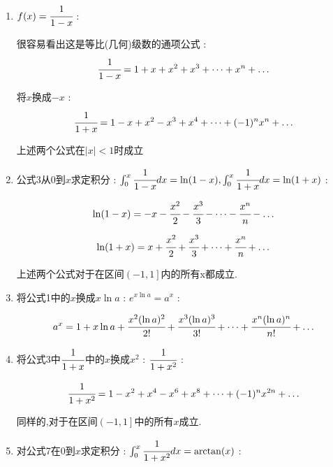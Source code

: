 \documentclass[UTF8,12pt]{ctexbook}
\newcommand{\derivative}{^\prime}
\newcommand{\fDerivative}[1]{\fint\derivative(#1)}
\newcommand{\defFunction}[1]{f(#1)}
\newcommand{\definiteIntegral}[2]{\int^{#1}_{#2}}
\newcommand{\absoluteValue}[1]{\left\lvert #1 \right\vert}
\begin{document}
{{{{{\begin{enumerate}
{            总结规律,可知 : 展开式只有奇数次项,并且正负会交替出现 :
            $$
              \sin(x) = x - \cfrac{x^3}{3!} + \cfrac{x^5}{5!} - \cfrac{x^7}{7!} + \dots + (-1)^n\cfrac{x^{2n + 1}}{(2n + 1)!} + \dots
            $$

            由$\fDerivative{x} = g(x)$,对上式求导就会得到$\cos$的展开式 :
            $$
              \cos(x) = 1 - \cfrac{x^2}{2!} + \cfrac{x^4}{4!} - \cfrac{x^6}{6!} + \dots + (-1)^n\cfrac{x^{2n}}{(2n)!} + \dots
            $$

            特点是只有偶次项.
            }
      \item {
            $\defFunction{x} = \cfrac{1}{1 - x}$ :

            很容易看出这是等比(几何)级数的通项公式 :
            $$
              \cfrac{1}{1 - x} =1 + x + x^2 + x^3 + \dots + x^n + \dots
            $$

            将$x$换成$-x$ :
            $$
              \cfrac{1}{1 + x} = 1 - x + x^2 - x^3 + x^4 + \dots + (-1)^nx^n + \dots
            $$

            上述两个公式在$\absoluteValue{x} < 1$时成立
            }
      \item{
            公式3从$0$到$x$求定积分 : $\definiteIntegral{x}{0}\cfrac{1}{1 - x}dx = \ln(1 - x),\definiteIntegral{x}{0}\cfrac{1}{1 + x}dx = \ln(1 + x)$ :

            $$
              \ln(1 - x) = -x - \cfrac{x^2}{2} - \cfrac{x^3}{3} - \dots - \cfrac{x^n}{n} - \dots
            $$

            $$
              \ln(1 + x) = x + \cfrac{x^2}{2} + \cfrac{x^3}{3} + \dots + \cfrac{x^n}{n} + \dots
            $$

            上述两个公式对于在区间$\left(-1,1\right]$内的所有x都成立.
            }
      \item {
            将公式1中的$x$换成$x\ln a$ : $e^{x\ln a} = a^x$ :

            $$
              a^x = 1 + x\ln a + \cfrac{x^2(\ln a)^2}{2!} + \cfrac{x^3(\ln a)^3}{3!} + \dots + \cfrac{x^n(\ln a)^n}{n!} + \dots
            $$
            }
      \item{
            将公式3中$\cfrac{1}{1 + x}$中的$x$换成$x^2$ : $\cfrac{1}{1 + x^2}$ :

            $$
              \cfrac{1}{1 + x^2} = 1 - x^2 + x^4 - x^6 + x^8 + \dots + (-1)^nx^{2n} + \dots
            $$

            同样的,对于在区间$\left(-1,1\right]$中的所有$x$成立.
            }
      \item {
            对公式7在$0$到$x$求定积分 : $\definiteIntegral{x}{0}\cfrac{1}{1 + x^2}dx = \arctan(x)$  :

}
\end{enumerate}}}}}}
\end{document}
